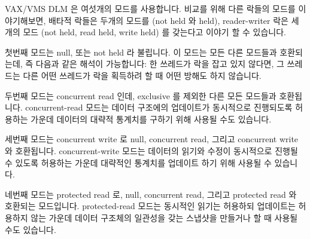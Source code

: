 VAX/VMS DLM 은 여섯개의 모드를 사용합니다.
비교를 위해 다른 락들의 모드를 이야기해보면, 배타적 락들은 두개의 모드를 (not
held 와 held), reader-writer 락은 세개의 모드 (not held, read held, write held)
를 갖는다고 이야기 할 수 있습니다.

첫번째 모드는 null, 또는 not held 라 불립니다.
이 모드는 모든 다른 모드들과 호환되는데, 즉 다음과 같은 해석이 가능합니다:
한 쓰레드가 락을 잡고 있지 않다면, 그 쓰레드는 다른 어떤 쓰레드가 락을 획득하려
할 때 어떤 방해도 하지 않습니다.

두번째 모드는 concurrent read 인데, exclusive 를 제외한 다른 모든 모드들과
호환됩니다.
concurrent-read 모드는 데이터 구조에의 업데이트가 동시적으로 진행되도록
허용하는 가운데 데이터의 대략적 통계치를 구하기 위해 사용될 수도 있습니다.

세번째 모드는 concurrent write 로 null, concurrent read, 그리고 concurrent
write 와 호환됩니다.
concurrent-write 모드는 데이터의 읽기와 수정이 동시적으로 진행될 수 있도록
허용하는 가운데 대략적인 통계치를 업데이트 하기 위해 사용될 수 있습니다.

네번째 모드는 protected read 로, null, concurrent read, 그리고 protected read
와 호환되는 모드입니다.
protected-read 모드는 동시적인 읽기는 허용하되 업데이트는 허용하지 않는 가운데
데이터 구조체의 일관성을 갖는 스냅샷을 만들거나 할 때 사용될 수도 있습니다.

